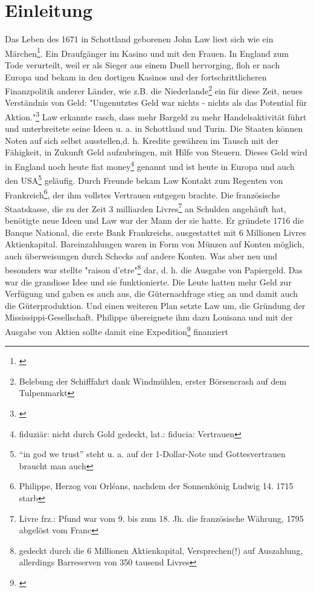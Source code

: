 \documentclass[
        onecolumn,
        a4paper,
        abstracton,
        parskip=half
        ,final
        ]{scrartcl}
\begin{document}
            \tableofcontents

            \newpage
            \onehalfspacing


\section{Einleitung}
    \label{sec1:einleitung}

Das Leben des 1671 in Schottland geborenen John Law liest sich wie ein M{\"a}rchen\footnote[1]{\citep*[vgl.][Kap.2]{strathern2006schumpeters}}. Ein Draufg{\"a}nger im Kasino und mit den Frauen. In England zum Tode verurteilt, weil er als Sieger aus einem Duell hervorging, floh er nach Europa und bekam in den dortigen Kasinos und der fortschrittlicheren Finanzpolitik anderer L{\"a}nder, wie z.B. die Niederlande\footnote[2]{Belebung der Schifffahrt dank Windm{\"u}hlen, erster B{\"o}rsencrash auf dem Tulpenmarkt} ein f{\"u}r diese Zeit, neues Verst{\"a}ndnis von Geld: "Ungenutztes Geld war nichts - nichts als das Potential f{\"u}r Aktion."\footnote[3]{\citep*[vgl.][Kap.3]{strathern2006schumpeters}} Law erkannte rasch, dass mehr Bargeld zu mehr Handelsaktivit{\"a}t f{\"u}hrt und unterbreitete seine Ideen u. a. in Schottland und Turin. Die Staaten k{\"o}nnen Noten auf sich selbst ausstellen,d. h. Kredite gew{\"a}hren im Tausch mit der F{\"a}higkeit, in Zukunft Geld aufzubringen, mit Hilfe von Steuern. Dieses Geld wird in England noch heute fiat money\footnote[4]{fiduzi{\"a}r: nicht durch Gold gedeckt, lat.: fiducia: Vertrauen} genannt und ist heute in Europa und auch den USA\footnote[5]{"`in god we trust"' steht u. a. auf der 1-Dollar-Note und Gottesvertrauen braucht man auch} gel{\"a}ufig. Durch Freunde bekam Law Kontakt zum Regenten von Frankreich\footnote[6]{Philippe, Herzog von Orl\'{e}ans, nachdem der Sonnenk{\"o}nig Ludwig 14. 1715 starb}, der ihm vollstes Vertrauen entgegen brachte. Die franz{\"o}sische Staatskasse, die zu der Zeit 3 milliarden Livres\footnote[7]{Livre frz.: Pfund war vom 9. bis zum 18. Jh. die franz{\"o}sische W{\"a}hrung, 1795 abgel{\"o}st vom Franc} an Schulden angeh{\"a}uft hat, ben{\"o}tigte neue Ideen und Law war der Mann der sie hatte. Er gr{\"u}ndete 1716 die Banque National, die erste Bank Frankreichs, ausgestattet mit 6 Millionen Livres Aktienkapital. Bareinzahlungen waren in Form von M{\"u}nzen auf Konten m{\"o}glich, auch {\"u}berweisungen durch Schecks auf andere Konten. Was aber neu und besonders war stellte "raison d'etre"\footnote[8]{gedeckt durch die 6 Millionen Aktienkapital, Versprechen(!) auf Auszahlung, allerdings Barreserven von 350 tausend Livres} dar, d. h. die Ausgabe von Papiergeld. Das war die grandiose Idee und sie funktionierte. Die Leute hatten mehr Geld zur Verf{\"u}gung und gaben es auch aus, die G{\"u}ternachfrage stieg an und damit auch die G{\"u}terproduktion. Und einen weiteren Plan setzte Law um, die Gr{\"u}ndung der Mississippi-Gesellschaft. Philippe {\"u}bereignete ihm dazu Louisana und mit der Ausgabe von Aktien sollte damit eine Expedition\footnote[9]{\citep*[vgl.][Kap.3]{strathern2006schumpeters}} finanziert 
\end{document}
